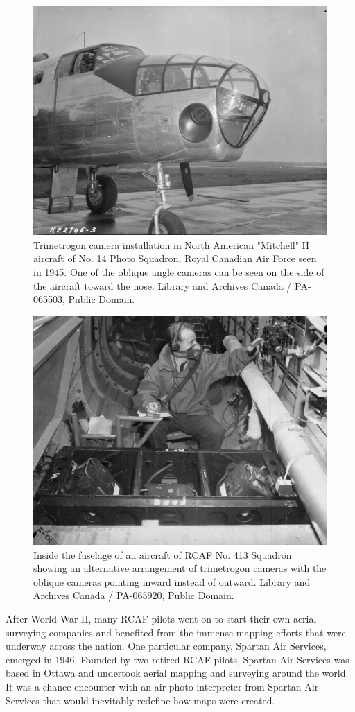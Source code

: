 \documentclass[
]{book}
\begin{document}
\begin{figure}
\includegraphics[width=0.75\linewidth]{images/01-trimetrogon-airplane} \caption{Trimetrogon camera installation in North American "Mitchell" II aircraft of No. 14 Photo Squadron, Royal Canadian Air Force seen in 1945. One of the oblique angle cameras can be seen on the side of the aircraft toward the nose. Library and Archives Canada / PA-065503, Public Domain.}\label{fig:1-trimetrogon-airplane}
\end{figure}

\begin{figure}
\includegraphics[width=0.75\linewidth]{images/01-no-413-squadron} \caption{Inside the fuselage of an aircraft of RCAF No. 413 Squadron showing an alternative arrangement of trimetrogon cameras with the oblique cameras pointing inward instead of outward. Library and Archives Canada / PA-065920, Public Domain.}\label{fig:1-no-413-squadron}
\end{figure}

After World War II, many RCAF pilots went on to start their own aerial surveying companies and benefited from the immense mapping efforts that were underway across the nation. One particular company, Spartan Air Services, emerged in 1946. Founded by two retired RCAF pilots, Spartan Air Services was based in Ottawa and undertook aerial mapping and surveying around the world. It was a chance encounter with an air photo interpreter from Spartan Air Services that would inevitably redefine how maps were created.
\end{document}
